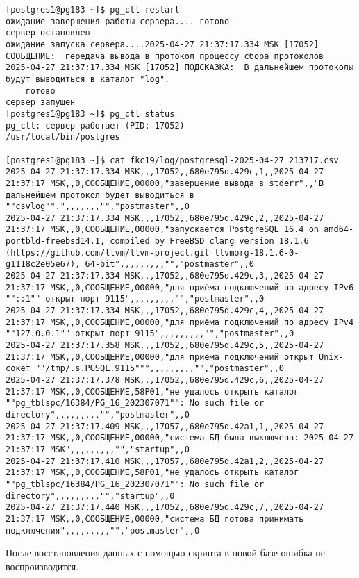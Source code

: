 \begin{verbatim}
[postgres1@pg183 ~]$ pg_ctl restart
ожидание завершения работы сервера.... готово
сервер остановлен
ожидание запуска сервера....2025-04-27 21:37:17.334 MSK [17052] СООБЩЕНИЕ:  передача вывода в протокол процессу сбора протоколов
2025-04-27 21:37:17.334 MSK [17052] ПОДСКАЗКА:  В дальнейшем протоколы будут выводиться в каталог "log".
    готово
сервер запущен
[postgres1@pg183 ~]$ pg_ctl status
pg_ctl: сервер работает (PID: 17052)
/usr/local/bin/postgres

[postgres1@pg183 ~]$ cat fkc19/log/postgresql-2025-04-27_213717.csv
2025-04-27 21:37:17.334 MSK,,,17052,,680e795d.429c,1,,2025-04-27 21:37:17 MSK,,0,СООБЩЕНИЕ,00000,"завершение вывода в stderr",,"В дальнейшем протокол будет выводиться в ""csvlog"".",,,,,,,"","postmaster",,0
2025-04-27 21:37:17.334 MSK,,,17052,,680e795d.429c,2,,2025-04-27 21:37:17 MSK,,0,СООБЩЕНИЕ,00000,"запускается PostgreSQL 16.4 on amd64-portbld-freebsd14.1, compiled by FreeBSD clang version 18.1.6 (https://github.com/llvm/llvm-project.git llvmorg-18.1.6-0-g1118c2e05e67), 64-bit",,,,,,,,,"","postmaster",,0
2025-04-27 21:37:17.334 MSK,,,17052,,680e795d.429c,3,,2025-04-27 21:37:17 MSK,,0,СООБЩЕНИЕ,00000,"для приёма подключений по адресу IPv6 ""::1"" открыт порт 9115",,,,,,,,,"","postmaster",,0
2025-04-27 21:37:17.334 MSK,,,17052,,680e795d.429c,4,,2025-04-27 21:37:17 MSK,,0,СООБЩЕНИЕ,00000,"для приёма подключений по адресу IPv4 ""127.0.0.1"" открыт порт 9115",,,,,,,,,"","postmaster",,0
2025-04-27 21:37:17.358 MSK,,,17052,,680e795d.429c,5,,2025-04-27 21:37:17 MSK,,0,СООБЩЕНИЕ,00000,"для приёма подключений открыт Unix-сокет ""/tmp/.s.PGSQL.9115""",,,,,,,,,"","postmaster",,0
2025-04-27 21:37:17.378 MSK,,,17052,,680e795d.429c,6,,2025-04-27 21:37:17 MSK,,0,СООБЩЕНИЕ,58P01,"не удалось открыть каталог ""pg_tblspc/16384/PG_16_202307071"": No such file or directory",,,,,,,,,"","postmaster",,0
2025-04-27 21:37:17.409 MSK,,,17057,,680e795d.42a1,1,,2025-04-27 21:37:17 MSK,,0,СООБЩЕНИЕ,00000,"система БД была выключена: 2025-04-27 21:37:17 MSK",,,,,,,,,"","startup",,0
2025-04-27 21:37:17.410 MSK,,,17057,,680e795d.42a1,2,,2025-04-27 21:37:17 MSK,,0,СООБЩЕНИЕ,58P01,"не удалось открыть каталог ""pg_tblspc/16384/PG_16_202307071"": No such file or directory",,,,,,,,,"","startup",,0
2025-04-27 21:37:17.440 MSK,,,17052,,680e795d.429c,7,,2025-04-27 21:37:17 MSK,,0,СООБЩЕНИЕ,00000,"система БД готова принимать подключения",,,,,,,,,"","postmaster",,0
\end{verbatim}

После восстановления данных с помощью скрипта в новой базе ошибка не воспроизводится.

